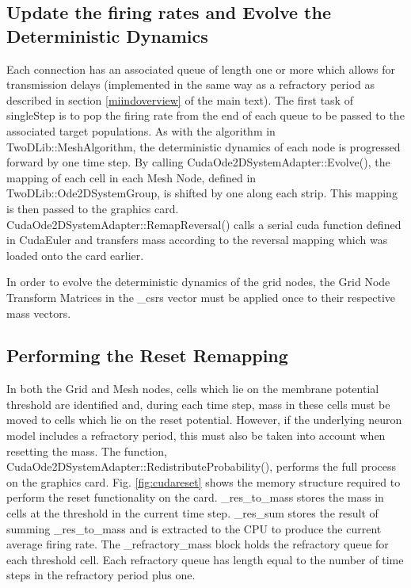 \documentclass[utf8]{frontiers_suppmat} %
\begin{document}
\subsection{Update the firing rates and Evolve the Deterministic Dynamics}

Each connection has an associated queue of length one or more which allows for transmission delays (implemented in the same way as a refractory period as described in section \ref{miindoverview} of the main text). The first task of singleStep is to pop the firing rate from the end of each queue to be passed to the associated target populations. As with the algorithm in TwoDLib::MeshAlgorithm, the deterministic dynamics of each node is progressed forward by one time step. By calling CudaOde2DSystemAdapter::Evolve(), the mapping of each cell in each Mesh Node, defined in TwoDLib::Ode2DSystemGroup, is shifted by one along each strip. This mapping is then passed to the graphics card. CudaOde2DSystemAdapter::RemapReversal() calls a serial cuda function defined in CudaEuler and transfers mass according to the reversal mapping which was loaded onto the card earlier. 

In order to evolve the deterministic dynamics of the grid nodes, the Grid Node Transform Matrices in the \_csrs vector must be applied once to their respective mass vectors. \\

\subsection{Performing the Reset Remapping}

In both the Grid and Mesh nodes, cells which lie on the membrane potential threshold are identified and, during each time step, mass in these cells must be moved to cells which lie on the reset potential. However, if the underlying neuron model includes a refractory period, this must also be taken into account when resetting the mass. The function, CudaOde2DSystemAdapter::RedistributeProbability(), performs the full process on the graphics card. Fig. \ref{fig:cudareset} shows the memory structure required to perform the reset functionality on the card. \_res\_to\_mass stores the mass in cells at the threshold in the current time step. \_res\_sum stores the result of summing \_res\_to\_mass and is extracted to the CPU to produce the current average firing rate. The \_refractory\_mass block holds the refractory queue for each threshold cell. Each refractory queue has length equal to the number of time steps in the refractory period plus one. 
\end{document}
